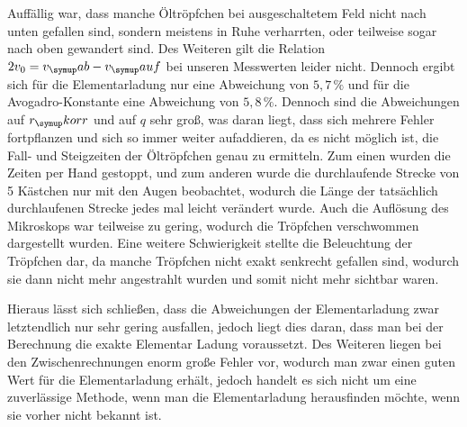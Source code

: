 Auffällig war, dass manche Öltröpfchen bei ausgeschaltetem Feld nicht
nach unten gefallen sind, sondern meistens in Ruhe verharrten, oder
teilweise sogar nach oben gewandert sind. Des Weiteren gilt
die Relation $2v_0 = v_\su{ab}-v_\su{auf}$ bei unseren Messwerten
leider nicht. Dennoch ergibt sich für die Elementarladung nur eine
Abweichung von $5,7\,\%$ und für die Avogadro-Konstante eine
Abweichung von $5,8\,\%$.
Dennoch sind die Abweichungen auf $r_\su{korr}$ und auf $q$ sehr
groß, was daran liegt, dass sich mehrere Fehler fortpflanzen und sich
so immer weiter aufaddieren, da es nicht möglich ist, die Fall- und
Steigzeiten der Öltröpfchen genau zu ermitteln. Zum einen wurden die
Zeiten per Hand gestoppt, und zum anderen wurde die durchlaufende Strecke
von 5 Kästchen nur mit den Augen beobachtet, wodurch die Länge der tatsächlich
durchlaufenen Strecke jedes mal leicht verändert wurde. Auch
die Auflösung des Mikroskops war teilweise zu gering, wodurch die Tröpfchen
verschwommen dargestellt wurden. Eine weitere Schwierigkeit stellte die
Beleuchtung der Tröpfchen dar, da manche Tröpfchen nicht exakt senkrecht gefallen
sind, wodurch sie dann nicht mehr angestrahlt wurden und somit nicht mehr sichtbar waren.

Hieraus lässt sich schließen, dass die Abweichungen der Elementarladung zwar
letztendlich nur sehr gering ausfallen, jedoch liegt dies daran, dass man bei der Berechnung
die exakte Elementar Ladung voraussetzt. Des Weiteren liegen bei den Zwischenrechnungen
enorm große Fehler vor, wodurch man zwar einen guten Wert für die Elementarladung erhält,
jedoch handelt es sich nicht um eine zuverlässige Methode, wenn man die Elementarladung herausfinden möchte, wenn sie vorher nicht bekannt ist.
